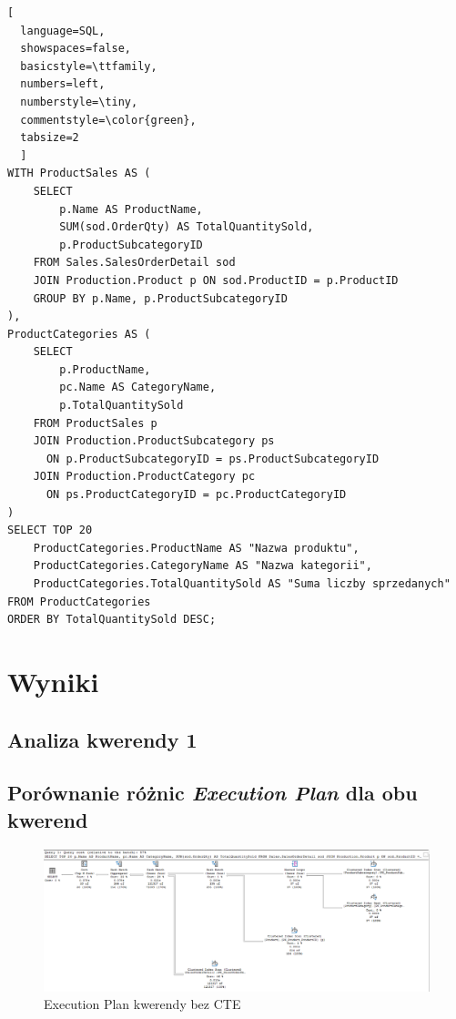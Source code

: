 \documentclass[a4paper,12pt]{article}
\begin{document}
\begin{lstlisting}[
  language=SQL,
  showspaces=false,
  basicstyle=\ttfamily,
  numbers=left,
  numberstyle=\tiny,
  commentstyle=\color{green},
  tabsize=2
  ]
WITH ProductSales AS (
    SELECT 
        p.Name AS ProductName, 
        SUM(sod.OrderQty) AS TotalQuantitySold,
		p.ProductSubcategoryID
    FROM Sales.SalesOrderDetail sod
    JOIN Production.Product p ON sod.ProductID = p.ProductID
    GROUP BY p.Name, p.ProductSubcategoryID
),
ProductCategories AS (
	SELECT
		p.ProductName,
		pc.Name AS CategoryName,
		p.TotalQuantitySold
	FROM ProductSales p		
    JOIN Production.ProductSubcategory ps 
      ON p.ProductSubcategoryID = ps.ProductSubcategoryID
    JOIN Production.ProductCategory pc 
      ON ps.ProductCategoryID = pc.ProductCategoryID
)
SELECT TOP 20
	ProductCategories.ProductName AS "Nazwa produktu",
	ProductCategories.CategoryName AS "Nazwa kategorii", 
	ProductCategories.TotalQuantitySold AS "Suma liczby sprzedanych"
FROM ProductCategories
ORDER BY TotalQuantitySold DESC;
\end{lstlisting}

\section{Wyniki}

\subsection{Analiza kwerendy 1}

\subsection{Porównanie różnic \textit{Execution Plan} dla obu kwerend}

\begin{figure}[H]
  \centering
  \includegraphics[width=1.0\textwidth]{images/query_1_plan.png}
  \caption{Execution Plan kwerendy bez CTE}
\end{figure}
\end{document}
